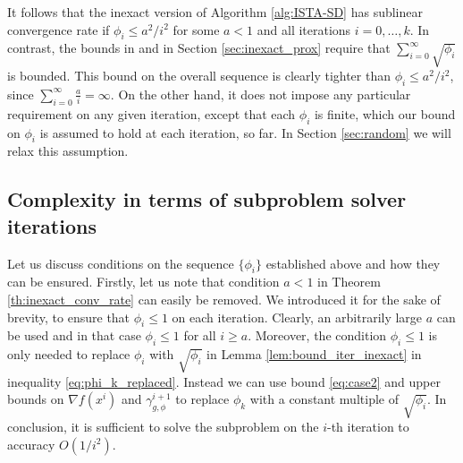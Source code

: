 \documentclass[11pt]{article}
\numberwithin{equation}{section}
\begin{document}
\begin{remark} It follows that the inexact version of Algorithm \ref{alg:ISTA-SD}   has sublinear convergence rate if 
$\phi_i\leq a^2/i^2$  for some $a<1$ and all iterations $i=0, \ldots, k$. 
In contrast,  the bounds in \cite{Schmidtetal} and in Section \ref{sec:inexact_prox} 
require that $\sum_{i=0}^{\infty} \sqrt{\phi_i}$ is  bounded. 
This bound  on the overall sequence is clearly 
tighter than $\phi_i\leq a^2/i^2$, since $\sum_{i=0}^{\infty} \frac{a}{i}=\infty$. 
On the other hand, it does not impose any particular requirement on any given iteration, except that 
each $\phi_i$ is finite, which our bound on $\phi_i$ is assumed to hold at each iteration, so far. In Section \ref{sec:random} we will relax this assumption. 
\end{remark}

\subsection{Complexity in terms of subproblem solver iterations}
Let us discuss  conditions on the sequence  $\{\phi_i\}$ established above and how they can be ensured. 
Firstly, let us note that condition $a<1$ in Theorem \ref{th:inexact_conv_rate} can easily be removed. 
We introduced it for the sake of brevity, to ensure that $\phi_i\leq 1$ on each iteration. Clearly, an arbitrarily large $a$ can be used and in that case
$\phi_i\leq 1$ for all $i\geq a$. Moreover, the condition $\phi_i\leq 1$ is only needed to replace $\phi_i$ with $\sqrt{\phi_i}$ in 
Lemma \ref{lem:bound_iter_inexact} in inequality \eqref{eq:phi_k_replaced}. Instead we can use bound \eqref{eq:case2} and 
upper bounds on $\nabla f(x^i)$ and $\gamma^{i+1}_{g,\phi}$ to replace $\phi_k$ with a constant multiple of $\sqrt{\phi_i}$. 
In conclusion, it is sufficient to solve the subproblem on the $i$-th iteration to accuracy $O(1/i^2)$. 
\end{document}

